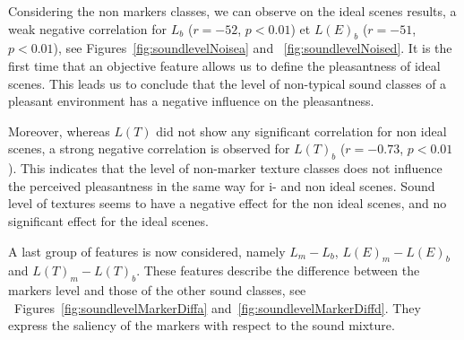 \documentclass[12pt]{elsarticle}
\newcommand{\cf}{cf.}
\begin{document}
Considering the non markers classes, we can observe on the ideal scenes results, a weak negative correlation for $L_b$  ($r=-52$, $p<0.01$) et $L(E)_b$ ($r=-51$, $p<0.01$), see Figures~\ref{fig:soundlevelNoisea}  and ~\ref{fig:soundlevelNoised}. It is the first time that an objective feature allows us to define the pleasantness of ideal scenes. This leads us to conclude that the level of non-typical sound classes of a pleasant environment has a negative influence on the pleasantness.


Moreover, whereas $L(T)$ did not show any significant correlation for non ideal scenes, a strong negative correlation is observed for $L(T)_b$ ($r = -0.73$, $p < 0.01$). This indicates that the level of non-marker texture classes does not influence the perceived pleasantness in the same way for i- and non ideal scenes. Sound level of textures seems to have a negative effect for the non ideal scenes, and no significant effect for the ideal scenes.


A last group of features is now considered, namely $L_m-L_b$, $L(E)_m-L(E)_b$ and $L(T)_m-L(T)_b$.  These features describe the difference between the markers level and those of the other sound classes, see ~Figures~\ref{fig:soundlevelMarkerDiffa} and~\ref{fig:soundlevelMarkerDiffd}. They express the saliency of the markers with respect to the sound mixture.

\end{document}
